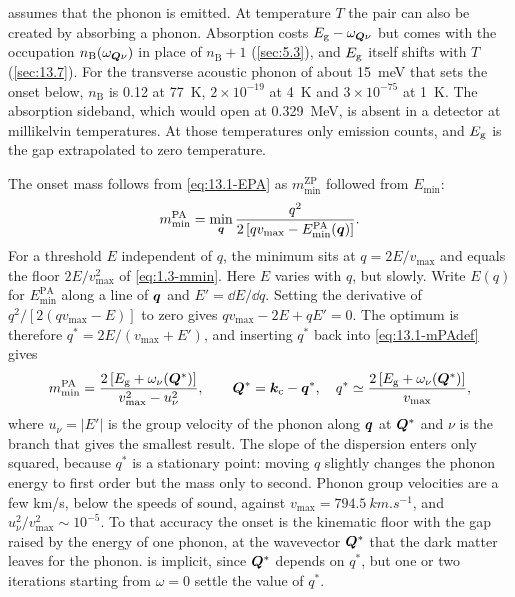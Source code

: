  assumes that the phonon is emitted. At temperature $T$ the pair can also be created by absorbing a phonon. Absorption costs $E_{\mathrm{g}} - \omega_{\bm{Q}\nu}$ but comes with the occupation $n_{\mathrm{B}}(\omega_{\bm{Q}\nu})$ in place of $n_{\mathrm{B}} + 1$ (\cref{sec:5.3}), and $E_{\mathrm{g}}$ itself shifts with $T$ (\cref{sec:13.7}). For the transverse acoustic phonon of about \SI{15}{meV} that sets the onset below, $n_{\mathrm{B}}$ is 0.12 at \SI{77}{K}, $2\times10^{-19}$ at \SI{4}{K} and $3\times10^{-75}$ at \SI{1}{K}. The absorption sideband, which would open at \SI{0.329}{MeV}, is absent in a detector at millikelvin temperatures. At those temperatures only emission counts, and $E_{\mathrm{g}}$ is the gap extrapolated to zero temperature.

The onset mass follows from \cref{eq:13.1-EPA} as $m_{\mathrm{min}}^{\mathrm{ZP}}$ followed from $E_{\mathrm{min}}$:
\begin{equation}
  m_{\mathrm{min}}^{\mathrm{PA}} = \min_{\bm{q}}\frac{q^2}{2\,[qv_{\mathrm{max}} - E_{\mathrm{min}}^{\mathrm{PA}}(\bm{q})]} .
  \label{eq:13.1-mPAdef}
\end{equation}
For a threshold $E$ independent of $q$, the minimum sits at $q = 2E/v_{\mathrm{max}}$ and equals the floor $2E/v_{\mathrm{max}}^2$ of \cref{eq:1.3-mmin}. Here $E$ varies with $q$, but slowly. Write $E(q)$ for $E_{\mathrm{min}}^{\mathrm{PA}}$ along a line of $\bm{q}$ and $E' = \dd E/\dd q$. Setting the derivative of $q^2/[2(qv_{\mathrm{max}} - E)]$ to zero gives $qv_{\mathrm{max}} - 2E + qE' = 0$. The optimum is therefore $q^* = 2E/(v_{\mathrm{max}} + E')$, and inserting $q^*$ back into \cref{eq:13.1-mPAdef} gives
\begin{equation}
  m_{\mathrm{min}}^{\mathrm{PA}} = \frac{2\,[E_{\mathrm{g}} + \omega_\nu(\bm{Q}^*)]}{v_{\mathrm{max}}^2 - u_\nu^2} ,
  \qquad \bm{Q}^* = \bm{k}_{\mathrm{c}} - \bm{q}^* ,\quad q^* \simeq \frac{2\,[E_{\mathrm{g}} + \omega_\nu(\bm{Q}^*)]}{v_{\mathrm{max}}} ,
  \label{eq:13.1-mPA}
\end{equation}
where $u_\nu = |E'|$ is the group velocity of the phonon along $\bm{q}$ at $\bm{Q}^*$ and $\nu$ is the branch that gives the smallest result. The slope of the dispersion enters only squared, because $q^*$ is a stationary point: moving $q$ slightly changes the phonon energy to first order but the mass only to second. Phonon group velocities are a few km/s, below the speeds of sound, against $v_{\mathrm{max}} = \SI{794.5}{km.s^{-1}}$, and $u_\nu^2/v_{\mathrm{max}}^2 \sim 10^{-5}$. To that accuracy the onset is the kinematic floor with the gap raised by the energy of one phonon, at the wavevector $\bm{Q}^*$ that the dark matter leaves for the phonon.  is implicit, since $\bm{Q}^*$ depends on $q^*$, but one or two iterations starting from $\omega = 0$ settle the value of $q^*$.

